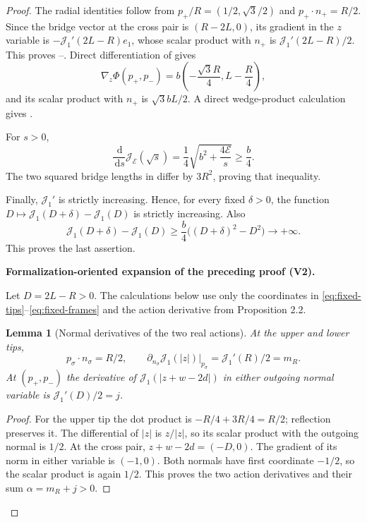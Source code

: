 \documentclass[11pt]{article}
\newtheorem{lemma}[theorem]{Lemma}
\newcommand{\formalisationparentid}{X}
\newenvironment{formalisationaddition}[1]{\par\medskip\begingroup\color{blue}\def\formalisationparentid{#1}\setcounter{formalizationsublemma}{0}\let\lemma\formalizationsublemma\let\endlemma\endformalizationsublemma
  \def\Eo{\mathcal E_h^\circ}\def\EE{\mathcal E_h}\def\phio{\phi_h^\circ}\def\phih{\phi_h}\def\Ho{H_h^{\rm atom}(v^\circ)}\def\Ha{H_h^{\rm atom}}\def\HL{H_h^{L}}\def\Dh{D_h}\def\Log{\operatorname{Log}}\def\ellh{\ell_h}\def\Gp{G_{p,h}}\def\Ast{A_{*,h}}\def\ahat{\widehat{\mathfrak a}_h}\def\ah{\mathfrak a_h}\def\rh{\widehat\rho_h}\def\deltah{\widehat\delta_h}\def\oldref##1{\textup{(##1)}}\def\interface##1{\par\noindent\textit{Analytical interface used here.} ##1\par}\def\finish{\par\noindent\textit{Conclusion of the formalization-oriented expansion.} }\par\noindent\textbf{Formalization-oriented expansion of the preceding proof (V2).}\par\smallskip
}{\par\endgroup\medskip
}
\newcommand{\dd}{\,\mathrm d}
\newcommand{\cE}{\mathcal E}
\newcommand{\cJ}{\mathcal J}
\begin{document}
\begin{proof}
The radial identities follow from
$p_+/R=(1/2,\sqrt3/2)$ and
$p_+\cdot n_+=R/2$.  Since the bridge vector at the cross pair is
$(R-2L,0)$, its gradient in the $z$ variable is
$-\cJ_1'(2L-R)e_1$, whose scalar product with $n_+$ is
$\cJ_1'(2L-R)/2$.  This proves --.
Direct differentiation of  gives
\[
 \nabla_z\Phi(p_+,p_-)
 =b\left(-\frac{\sqrt3R}{4},L-\frac R4\right),
\]
and its scalar product with $n_+$ is $\sqrt3bL/2$.  A direct wedge-product
calculation gives .

For $s>0$,
\[
 \frac{\dd}{\dd s}\cJ_\cE(\sqrt s)
 =\frac{1}{4}\sqrt{b^2+\frac{4\cE}{s}}
 \ge\frac b4.
\]
The two squared bridge lengths in  differ by
$3R^2$, proving that inequality.

Finally, $\cJ_1'$ is strictly increasing.  Hence, for every fixed
$\delta>0$, the function
$D\mapsto\cJ_1(D+\delta)-\cJ_1(D)$ is strictly increasing.  Also
\[
 \cJ_1(D+\delta)-\cJ_1(D)
 \ge\frac b4\bigl((D+\delta)^2-D^2\bigr)
 \longrightarrow+\infty.
\]
This proves the last assertion.

\begin{formalisationaddition}{P2.6}
Let $D=2L-R>0$. The calculations below use only the coordinates in \eqref{eq:fixed-tips}--\eqref{eq:fixed-frames} and the action derivative from Proposition 2.2.

\begin{lemma}[Normal derivatives of the two real actions]\label{sublemma:P2-6-action-slopes}
At the upper and lower tips,
\[
 p_\sigma\cdot n_\sigma=R/2,\qquad
 \partial_{n_\sigma}\cJ_1(|z|)\big|_{p_\sigma}=\cJ_1'(R)/2=m_R.
\]
At $(p_+,p_-)$ the derivative of $\cJ_1(|z+w-2d|)$ in either outgoing normal variable is $\cJ_1'(D)/2=j$.
\end{lemma}
\begin{proof}
For the upper tip the dot product is $-R/4+3R/4=R/2$; reflection preserves it. The differential of $|z|$ is $z/|z|$, so its scalar product with the outgoing normal is $1/2$.
At the cross pair, $z+w-2d=(-D,0)$. The gradient of its norm in either variable is $(-1,0)$. Both normals have first coordinate $-1/2$, so the scalar product is again $1/2$. This proves the two action derivatives and their sum $\alpha=m_R+j>0$.
\end{proof}


\end{formalisationaddition}
\end{proof}
\end{document}
